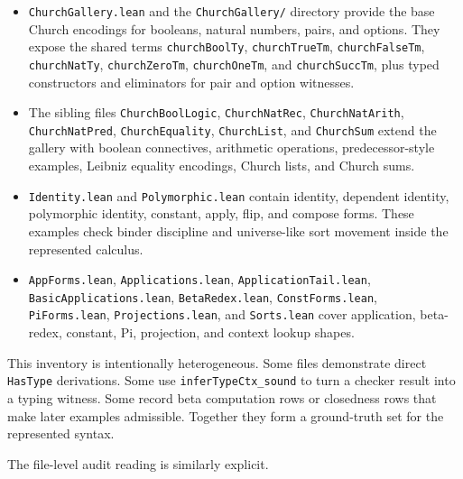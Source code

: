 \begin{itemize}
\item \texttt{ChurchGallery.lean} and the \texttt{ChurchGallery/} directory
  provide the base Church encodings for booleans, natural numbers, pairs, and
  options. They expose the shared terms \texttt{churchBoolTy},
  \texttt{churchTrueTm}, \texttt{churchFalseTm}, \texttt{churchNatTy},
  \texttt{churchZeroTm}, \texttt{churchOneTm}, and \texttt{churchSuccTm}, plus
  typed constructors and eliminators for pair and option witnesses.
\item The sibling files \texttt{ChurchBoolLogic}, \texttt{ChurchNatRec},
  \texttt{ChurchNatArith}, \texttt{ChurchNatPred}, \texttt{ChurchEquality},
  \texttt{ChurchList}, and \texttt{ChurchSum} extend the gallery with boolean
  connectives, arithmetic operations, predecessor-style examples, Leibniz
  equality encodings, Church lists, and Church sums.
\item \texttt{Identity.lean} and \texttt{Polymorphic.lean} contain identity,
  dependent identity, polymorphic identity, constant, apply, flip, and compose
  forms. These examples check binder discipline and universe-like sort
  movement inside the represented calculus.
\item \texttt{AppForms.lean}, \texttt{Applications.lean},
  \texttt{ApplicationTail.lean}, \texttt{BasicApplications.lean},
  \texttt{BetaRedex.lean}, \texttt{ConstForms.lean}, \texttt{PiForms.lean},
  \texttt{Projections.lean}, and \texttt{Sorts.lean} cover application,
  beta-redex, constant, Pi, projection, and context lookup shapes.
\end{itemize}

This inventory is intentionally heterogeneous. Some files demonstrate direct
\texttt{HasType} derivations. Some use \texttt{inferTypeCtx\_sound} to turn a
checker result into a typing witness. Some record beta computation rows or
closedness rows that make later examples admissible. Together they form a
ground-truth set for the represented syntax.

The file-level audit reading is similarly explicit.

